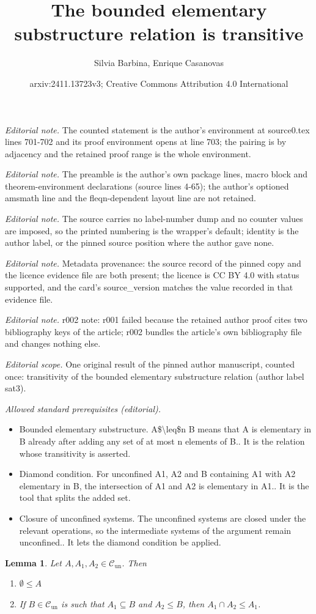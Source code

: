 \documentclass[10pt,a4paper]{article}
\title{The bounded elementary substructure relation is transitive}
\author{Silvia Barbina, Enrique Casanovas}
\date{arxiv:2411.13723v3; Creative Commons Attribution 4.0 International}
\newcommand{\Cun}{\mathcal{C}_\mathrm{un}}
\theoremstyle{note}
\newtheorem{lemma}[thm]{Lemma}
\begin{document}
\maketitle
\noindent\textit{Editorial note.} The counted statement is the author's environment at source0.tex lines 701-702 and its proof environment opens at line 703; the pairing is by adjacency and the retained proof range is the whole environment.\par\medskip
\noindent\textit{Editorial note.} The preamble is the author's own package lines, macro block and theorem-environment declarations (source lines 4-65); the author's optioned amsmath line and the fleqn-dependent layout line are not retained.\par\medskip
\noindent\textit{Editorial note.} The source carries no label-number dump and no counter values are imposed, so the printed numbering is the wrapper's default; identity is the author label, or the pinned source position where the author gave none.\par\medskip
\noindent\textit{Editorial note.} Metadata provenance: the source record of the pinned copy and the licence evidence file are both present; the licence is CC BY 4.0 with status supported, and the card's source\_version matches the value recorded in that evidence file.\par\medskip
\noindent\textit{Editorial note.} r002 note: r001 failed because the retained author proof cites two bibliography keys of the article; r002 bundles the article's own bibliography file and changes nothing else.\par\medskip
\noindent\textit{Editorial scope.} One original result of the pinned author manuscript, counted once: transitivity of the bounded elementary substructure relation (author label sat3).\par\medskip
\noindent\textit{Allowed standard prerequisites (editorial).}\begin{itemize}
\item Bounded elementary substructure. A\$\textbackslash{}leq\$n B means that A is elementary in B already after adding any set of at most n elements of B.. It is the relation whose transitivity is asserted.
\item Diamond condition. For unconfined A1, A2 and B containing A1 with A2 elementary in B, the intersection of A1 and A2 is elementary in A1.. It is the tool that splits the added set.
\item Closure of unconfined systems. The unconfined systems are closed under the relevant operations, so the intermediate systems of the argument remain unconfined.. It lets the diamond condition be applied.
\end{itemize}\medskip
\begin{lemma}\label{diamond} Let $A,A_1,A_2 \in \Cun$. Then
	\begin{enumerate}
		\item $\emptyset \leq A$  
	\item If $B\in \Cun$ is such that $A_1\subseteq B$ and $A_2\leq B$, then $A_1\cap A_2\leq A_1$.
	\end{enumerate}
\end{lemma}
\end{document}
